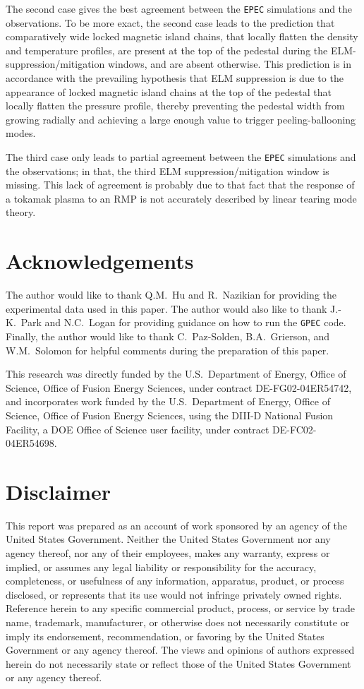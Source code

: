\documentclass[12pt,prb,aps]{revtex4-1}
\begin{document}
The second case gives the best agreement between the {\tt EPEC} simulations and the  observations. To be more
exact, the second case leads to the prediction that comparatively wide locked magnetic island chains, that locally flatten the density and temperature profiles, 
 are present at the top of the pedestal during the ELM-suppression/mitigation 
windows, and are absent otherwise. This prediction is in accordance with the prevailing hypothesis that ELM suppression is due to the appearance of locked
magnetic island chains at the top of the pedestal that locally flatten the pressure profile, thereby preventing the pedestal width from growing radially and achieving a  
large enough value to trigger peeling-ballooning modes.\cite{d3d}

 The third case only leads to partial agreement between  the {\tt EPEC} simulations and the  observations; in that, the third ELM suppression/mitigation window is
missing. This lack of agreement is probably due to that fact that the response of a tokamak plasma to an RMP is not accurately described by linear tearing mode theory.\cite{rf1} 

\section*{Acknowledgements}
The author would like to thank Q.M.~Hu and R.~Nazikian for providing the experimental data used in this paper. The
author would also like to thank J.-K.~Park and N.C.~Logan for providing guidance on how to run the {\tt GPEC} code. Finally, the
author would like to thank C.~Paz-Solden, B.A.~Grierson, and W.M.~Solomon for helpful comments during the preparation of this paper. 

This research was directly funded by the U.S.\ Department of Energy, Office of Science, Office of Fusion Energy Sciences,  under contract DE-FG02-04ER54742, and
incorporates work funded by the U.S.\ Department of Energy, Office of Science, Office of Fusion Energy Sciences, using the DIII-D National Fusion Facility, a DOE Office of Science user facility, under contract DE-FC02-04ER54698.  

\section*{Disclaimer} This report was prepared as an account of work sponsored by an agency of the United States Government. Neither the United States Government nor any agency thereof, nor any of their employees, makes any warranty, express or implied, or assumes any legal liability or responsibility for the accuracy, completeness, or usefulness of any information, apparatus, product, or process disclosed, or represents that its use would not infringe privately owned rights. Reference herein to any specific commercial product, process, or service by trade name, trademark, manufacturer, or otherwise does not necessarily constitute or imply its endorsement, recommendation, or favoring by the United States Government or any agency thereof. The views and opinions of authors expressed herein do not necessarily state or reflect those of the United States Government or any agency thereof. 
 
\end{document}
